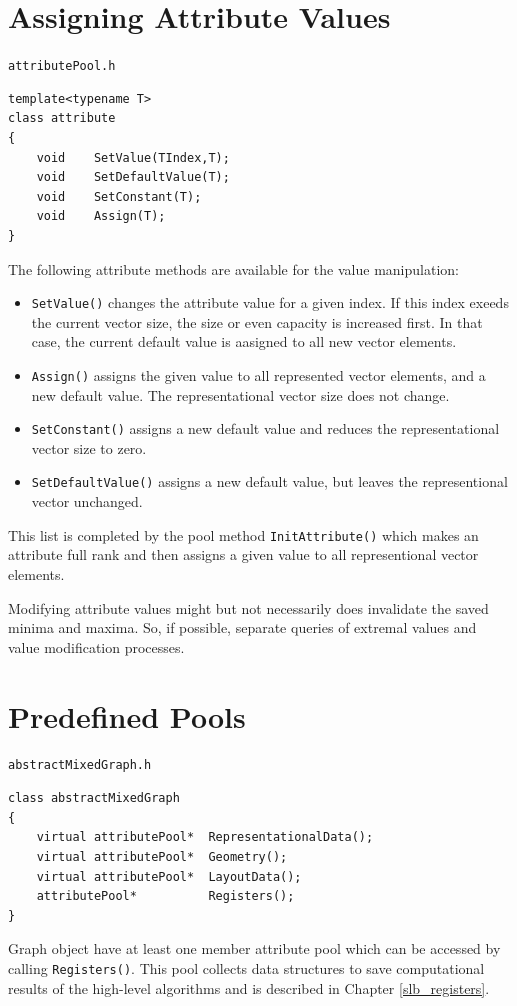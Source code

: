 \documentclass[a4paper,11pt,twoside]{book}
\begin{document}
\begin{multicols}{2}
\section{Assigning Attribute Values}
\myinclude\verb/attributePool.h/
\begin{mymethods}
\begin{verbatim}
template<typename T>
class attribute
{
    void    SetValue(TIndex,T);
    void    SetDefaultValue(T);
    void    SetConstant(T);
    void    Assign(T);
}
\end{verbatim}
\end{mymethods}
The following attribute methods are available for the value manipulation:
\begin{itemize}
\item \verb/SetValue()/ changes the attribute value for a given index. If this
    index exeeds the current vector size, the size or even capacity is increased
    first. In that case, the current default value is aasigned to all new vector
    elements.
\item \verb/Assign()/ assigns the given value to all represented vector elements,
    and a new default value. The representational vector size does not change.
\item \verb/SetConstant()/ assigns a new default value and reduces the
    representational vector size to zero.
\item \verb/SetDefaultValue()/ assigns a new default value, but leaves the
    representional vector unchanged.
\end{itemize}
This list is completed by the pool method \verb/InitAttribute()/ which makes an
attribute full rank and then assigns a given value to all representional vector
elements.

Modifying attribute values might but not necessarily does invalidate the saved
minima and maxima. So, if possible, separate queries of extremal values and value
modification processes.


\section{Predefined Pools}
\myinclude\verb/abstractMixedGraph.h/
\begin{mymethods}
\begin{verbatim}
class abstractMixedGraph
{
    virtual attributePool*  RepresentationalData();
    virtual attributePool*  Geometry();
    virtual attributePool*  LayoutData();
    attributePool*          Registers();
}
\end{verbatim}
\end{mymethods}
Graph object have at least one member attribute pool which can be accessed by
calling \verb/Registers()/. This pool collects data structures to save
computational results of the high-level algorithms and is described in Chapter
\ref{slb_registers}.


\end{multicols}
\end{document}
